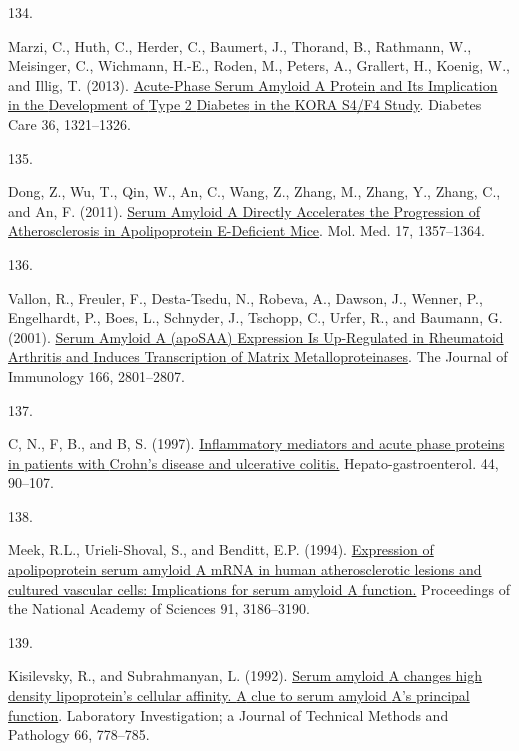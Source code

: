 \documentclass[
]{article}
\newlength{\cslhangindent}
\newlength{\csllabelwidth}
\newlength{\cslentryspacingunit} %
\newenvironment{CSLReferences}[2] %
 {%
  \setlength{\parindent}{0pt}
  \ifodd #1
  \let\oldpar\par
  \def\par{\hangindent=\cslhangindent\oldpar}
  \fi
  \setlength{\parskip}{#2\cslentryspacingunit}
 }%
 {}
\newcommand{\CSLLeftMargin}[1]{\parbox[t]{\csllabelwidth}{#1}}
\newcommand{\CSLRightInline}[1]{\parbox[t]{\linewidth - \csllabelwidth}{#1}\break}
\begin{document}
\begin{CSLReferences}{0}{0}
\leavevmode{}%
\CSLLeftMargin{134. }
\CSLRightInline{Marzi, C., Huth, C., Herder, C., Baumert, J., Thorand, B., Rathmann, W., Meisinger, C., Wichmann, H.-E., Roden, M., Peters, A., Grallert, H., Koenig, W., and Illig, T. (2013). \href{https://doi.org/10.2337/dc12-1514}{Acute-{Phase Serum Amyloid A Protein} and {Its Implication} in the {Development} of {Type} 2 {Diabetes} in the {KORA S4}/{F4 Study}}. Diabetes Care 36, 1321--1326.}

\leavevmode{}%
\CSLLeftMargin{135. }
\CSLRightInline{Dong, Z., Wu, T., Qin, W., An, C., Wang, Z., Zhang, M., Zhang, Y., Zhang, C., and An, F. (2011). \href{https://doi.org/10.2119/molmed.2011.00186}{Serum {Amyloid A Directly Accelerates} the {Progression} of {Atherosclerosis} in {Apolipoprotein E-Deficient Mice}}. Mol. Med. 17, 1357--1364.}

\leavevmode{}%
\CSLLeftMargin{136. }
\CSLRightInline{Vallon, R., Freuler, F., Desta-Tsedu, N., Robeva, A., Dawson, J., Wenner, P., Engelhardt, P., Boes, L., Schnyder, J., Tschopp, C., Urfer, R., and Baumann, G. (2001). \href{https://doi.org/10.4049/jimmunol.166.4.2801}{Serum {Amyloid A} ({apoSAA}) {Expression Is Up-Regulated} in {Rheumatoid Arthritis} and {Induces Transcription} of {Matrix Metalloproteinases}}. The Journal of Immunology 166, 2801--2807.}

\leavevmode{}%
\CSLLeftMargin{137. }
\CSLRightInline{C, N., F, B., and B, S. (1997). \href{https://www.ncbi.nlm.nih.gov/pubmed/9058126}{Inflammatory mediators and acute phase proteins in patients with {Crohn}'s disease and ulcerative colitis.} Hepato-gastroenterol. 44, 90--107.}

\leavevmode{}%
\CSLLeftMargin{138. }
\CSLRightInline{Meek, R.L., Urieli-Shoval, S., and Benditt, E.P. (1994). \href{https://doi.org/10.1073/pnas.91.8.3186}{Expression of apolipoprotein serum amyloid {A mRNA} in human atherosclerotic lesions and cultured vascular cells: Implications for serum amyloid {A} function.} Proceedings of the National Academy of Sciences 91, 3186--3190.}

\leavevmode{}%
\CSLLeftMargin{139. }
\CSLRightInline{Kisilevsky, R., and Subrahmanyan, L. (1992). \href{https://www.ncbi.nlm.nih.gov/pubmed/1602745}{Serum amyloid {A} changes high density lipoprotein's cellular affinity. {A} clue to serum amyloid {A}'s principal function}. Laboratory Investigation; a Journal of Technical Methods and Pathology 66, 778--785.}


\end{CSLReferences}
\end{document}
